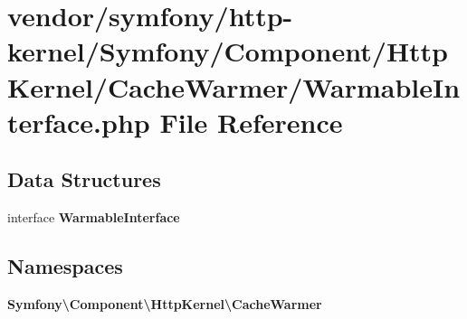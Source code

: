 \section{vendor/symfony/http-\/kernel/\+Symfony/\+Component/\+Http\+Kernel/\+Cache\+Warmer/\+Warmable\+Interface.php File Reference}
\label{_warmable_interface_8php}
\subsection*{Data Structures}
\begin{DoxyCompactItemize}
\item 
interface {\bf Warmable\+Interface}
\end{DoxyCompactItemize}
\subsection*{Namespaces}
\begin{DoxyCompactItemize}
\item 
 {\bf Symfony\textbackslash{}\+Component\textbackslash{}\+Http\+Kernel\textbackslash{}\+Cache\+Warmer}
\end{DoxyCompactItemize}
